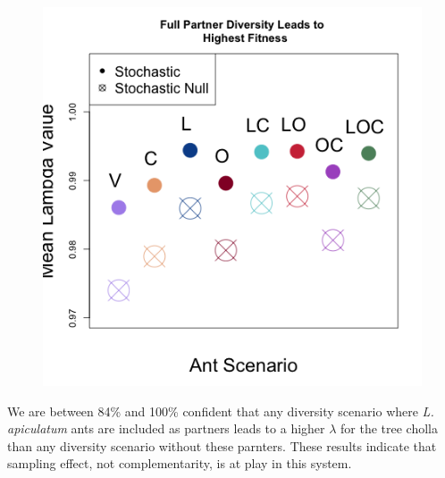 \documentclass[11pt]{article}
\begin{document}
\begin{figure}[H]
	\includegraphics[width=0.95\linewidth]{Figures/LambdaMeans.png}
\end{figure}

We are between 84\% and 100\% confident that any diversity scenario where \textit{L. apiculatum} ants are included as partners leads to a higher $\lambda$ for the tree cholla than any diversity scenario without these parnters.
These results indicate that sampling effect, not complementarity, is at play in this system.
\end{document}
